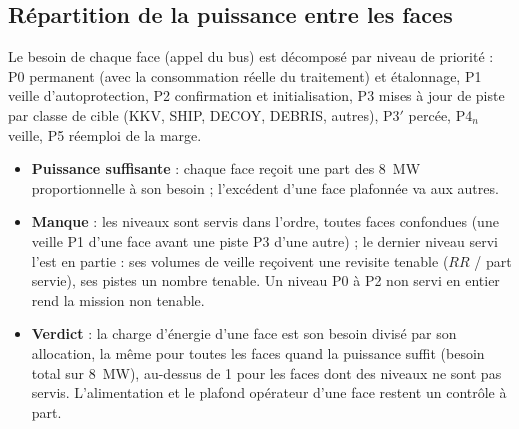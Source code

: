 \documentclass[11pt,a4paper]{article}
\begin{document}
\subsection{Répartition de la puissance entre les faces}
Le besoin de chaque face (appel du bus) est décomposé par niveau de priorité : P0 permanent (avec la consommation réelle
du traitement) et étalonnage, P1 veille d'autoprotection, P2 confirmation et initialisation, P3 mises à jour de piste
par classe de cible (KKV, SHIP, DECOY, DEBRIS, autres), P3$'$ percée, P4$_n$ veille, P5 réemploi de la marge.
\begin{itemize}
  \item \textbf{Puissance suffisante} : chaque face reçoit une part des \SI{8}{MW} proportionnelle à son besoin ;
        l'excédent d'une face plafonnée va aux autres.
  \item \textbf{Manque} : les niveaux sont servis dans l'ordre, toutes faces confondues (une veille P1 d'une face avant
        une piste P3 d'une autre) ; le dernier niveau servi l'est en partie : ses volumes de veille reçoivent une
        revisite tenable ($RR$ / part servie), ses pistes un nombre tenable. Un niveau P0 à P2 non servi en entier rend
        la mission non tenable.
  \item \textbf{Verdict} : la charge d'énergie d'une face est son besoin divisé par son allocation, la même pour toutes
        les faces quand la puissance suffit (besoin total sur \SI{8}{MW}), au-dessus de 1 pour les faces dont des
        niveaux ne sont pas servis. L'alimentation et le plafond opérateur d'une face restent un contrôle à part.
\end{itemize}
\end{document}
